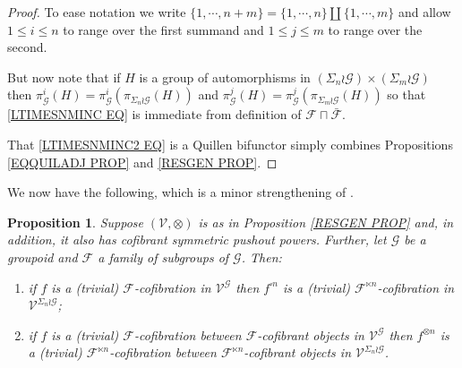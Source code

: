 \documentclass[a4paper,10pt
,draft
]{article}%
\numberwithin{equation}{section}
\numberwithin{figure}{section}
\newtheorem{proposition}[equation]{Proposition}%
\theoremstyle{definition} %
\newcommand{\F}{\ensuremath{\mathcal F}}
\newcommand{\V}{\ensuremath{\mathcal V}}
\newcommand{\G}{\ensuremath{\mathcal G}}
\newcommand{\1}{\ensuremath{\mathbbm 1}}%
\begin{document}
\begin{proof}
To ease notation we write
$\{1,\cdots, n+m\} = \{1,\cdots,n\} \amalg \{1,\cdots,m\}$
and allow $1\leq i\leq n$ to range over the first summand and $1 \leq j \leq m$ to range over the second.

But now note that if $H$ is a group of automorphisms in 
$(\Sigma_n \wr \G) \times (\Sigma_m \wr \G)$
then 
$\pi^i_{\G}(H) = \pi^i_{\G}(\pi_{\Sigma_n \wr \G}(H))$
and
$\pi^j_{\G}(H) = \pi^j_{\G}(\pi_{\Sigma_m \wr \G}(H))$
so that 
\eqref{LTIMESNMINC EQ} is immediate from definition of 
$\F \sqcap \bar{\F}$.

That \eqref{LTIMESNMINC2 EQ} is a Quillen bifunctor simply combines 
Propositions \ref{EQQUILADJ PROP} and \ref{RESGEN PROP}.
\end{proof}





We now have the following, which is a minor strengthening of 
\cite[Prop. 6.24]{BP_geo}.




\begin{proposition}\label{SIGMAWRGF PROP}
Suppose $(\V, \otimes)$ is as in Proposition \ref{RESGEN PROP} and, in addition, it also has cofibrant symmetric pushout powers.
Further, let $\G$ be a groupoid and
$\F$ a family of subgroups of $\G$.
Then:
\begin{enumerate}[label=(\roman*)]
\item if $f$ is a (trivial) $\F$-cofibration in $\V^{\G}$
then $f^{\square n}$ is a (trivial)
$\F^{\ltimes n}$-cofibration in $\V^{\Sigma_n \wr \G}$;
\item if $f$ is a (trivial) $\F$-cofibration between $\F$-cofibrant objects in $\V^{\G}$
then $f^{\otimes n}$ is a (trivial)
$\F^{\ltimes n}$-cofibration
between $\F^{\ltimes n}$-cofibrant objects in $\V^{\Sigma_n \wr \G}$.
\end{enumerate}
\end{proposition}
\end{document}
